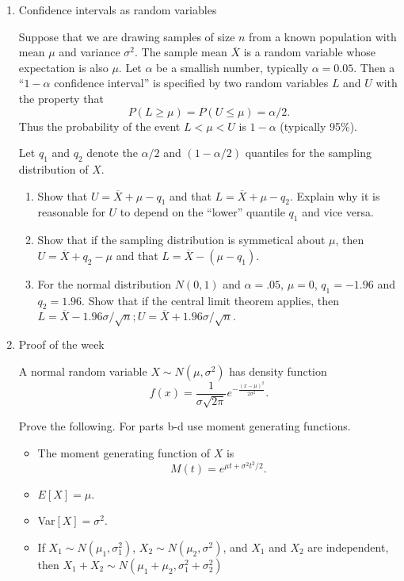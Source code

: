 \documentclass[12pt]{article}
\begin{document}
\begin{enumerate}

\item Confidence intervals as random variables

Suppose that we are drawing samples of size $n$ from a known population with mean $\mu$ and variance $\sigma^2$.
The sample mean $\overline{X}$ is a random variable whose expectation is also $\mu$.
Let $\alpha$ be a smallish number, typically $\alpha = 0.05.$
Then a ``$1-\alpha$ confidence interval'' is specified by two random variables $L$ and $U$ with the property that
$$P(L \geq \mu) = P(U \leq \mu) = \alpha/2.$$
Thus the probability of the event $L < \mu < U$ is $1 - \alpha$ (typically 95\%).

Let $q_1$ and $q_2$ denote the $\alpha/2$ and $(1-\alpha/2)$ quantiles for the sampling distribution of $X$.

\begin{enumerate}
\item Show that $U = \overline{X} + \mu - q_1$ and that $L =  \overline{X} + \mu - q_2$. Explain why it is reasonable for $U$ to depend on the ``lower'' quantile $q_1$ and vice versa.

\item Show that if the sampling distribution is symmetical about $\mu$, then $U = \overline{X} +  q_2 - \mu$ and that $L =  \overline{X} - (\mu - q_1)$.

\item For the normal distribution $N(0,1)$ and $\alpha = .05$,  $\mu = 0$, $q_1 = -1.96$ and $q_2= 1.96.$  Show that if the central limit theorem applies, then
 $L =  \overline{X} - 1.96 \sigma /\sqrt{n} ; U =  \overline{X} + 1.96 \sigma /\sqrt{n}.$
\end{enumerate}





\pagebreak


\item Proof of the week

 A normal random variable $X \sim N(\mu,\sigma^2)$ has density function $$f(x) = \frac{1}{\sigma\sqrt{2\pi}}e^{-\frac{(x-\mu)^2}{2\sigma^2}}.$$

Prove the following. For parts b-d use moment generating functions.
\begin{itemize}
\item The moment generating function of $X$ is $$M(t) = e^{\mu t + \sigma^2t^2/2}.$$
\item $E[X] = \mu.$
\item Var$[X] = \sigma^2.$
\item If  $X_1 \sim N(\mu_1,\sigma_1^2)$,  $X_2 \sim N(\mu_2,\sigma^2)$, and $X_1$ and $X_2$ are independent, then
 $X_1 + X_2 \sim N(\mu_1 + \mu_2,\sigma_1^2 + \sigma_2^2 )$
\end{itemize}

\end{enumerate}
\end{document}
